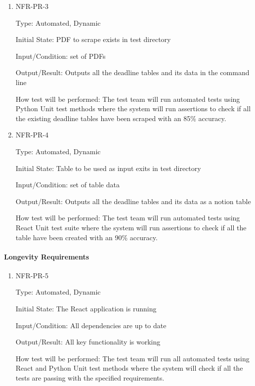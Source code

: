 \documentclass[12pt, titlepage]{article}
\begin{document}
\begin{enumerate}

\item{NFR-PR-3\\}

Type: Automated, Dynamic 

Initial State: PDF to scrape exists in test directory 

Input/Condition: set of PDFs 

Output/Result: Outputs all the deadline tables and its data in the command line 

How test will be performed: The test team will run automated tests using Python Unit test methods where the system will run assertions to check if all the existing deadline tables have been scraped with an 85\% accuracy.

\item{NFR-PR-4\\}

Type: Automated, Dynamic 

Initial State: Table to be used as input exits in test directory 

Input/Condition: set of table data 

Output/Result: Outputs all the deadline tables and its data as a notion table  

How test will be performed: The test team will run automated tests using React Unit test suite where the system will run assertions to check if all the table have been created with an 90\% accuracy.

\end{enumerate}

\paragraph{Longevity Requirements}

\begin{enumerate}

\item{NFR-PR-5\\}

Type: Automated, Dynamic 

Initial State: The React application is running 

Input/Condition: All dependencies are up to date 

Output/Result: All key functionality is working 

How test will be performed: The test team will run all automated tests using React and Python Unit test methods where the system will check if all the tests are passing with the specified requirements. 

\end{enumerate}
\end{document}
